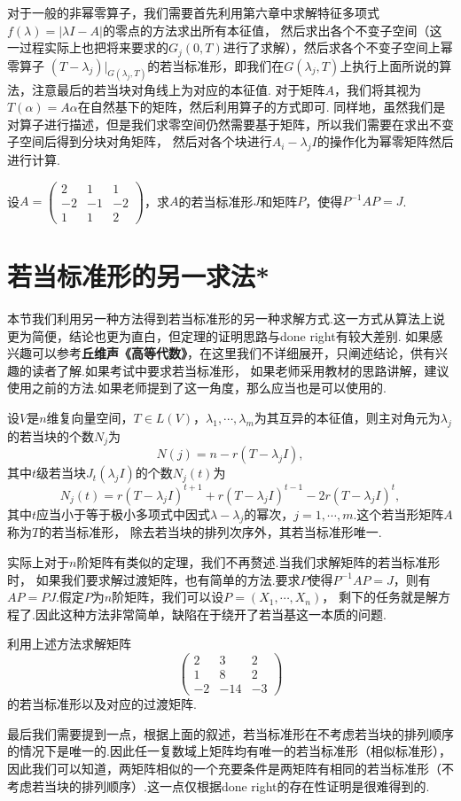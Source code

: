 对于一般的非幂零算子，我们需要首先利用第六章中求解特征多项式$f(\lambda)=|\lambda I-A|$的零点的方法求出所有本征值，
然后求出各个不变子空间（这一过程实际上也把将来要求的$G_j(0,T)$进行了求解），然后求各个不变子空间上幂零算子
$(T-\lambda_j)|_{G(\lambda_j,T)}$的若当标准形，即我们在$G(\lambda_j,T)$上执行上面所说的算法，注意最后的若当块对角线上为对应的本征值.
对于矩阵$A$，我们将其视为$T(\alpha)=A\alpha$在自然基下的矩阵，然后利用算子的方式即可.
同样地，虽然我们是对算子进行描述，但是我们求零空间仍然需要基于矩阵，所以我们需要在求出不变子空间后得到分块对角矩阵，
然后对各个块进行$A_i-\lambda_jI$的操作化为幂零矩阵然后进行计算.
\begin{example}
	设$A=\begin{pmatrix}
		2 & 1 & 1 \\ -2 & -1 & -2 \\ 1 & 1 & 2
	\end{pmatrix}$，求$A$的若当标准形$J$和矩阵$P$，使得$P^{-1}AP=J$.
\end{example}

\section{若当标准形的另一求法*}\label{若当标准形的另一求法}
本节我们利用另一种方法得到若当标准形的另一种求解方式.这一方式从算法上说更为简便，结论也更为直白，但定理的证明思路与done right有较大差别.
如果感兴趣可以参考\textbf{丘维声《高等代数》}，在这里我们不详细展开，只阐述结论，供有兴趣的读者了解.如果考试中要求若当标准形，
如果老师采用教材的思路讲解，建议使用之前的方法.如果老师提到了这一角度，那么应当也是可以使用的.
\begin{theorem}
	设$V$是$n$维复向量空间，$T\in L(V)$，$\lambda_1,\cdots,\lambda_m$为其互异的本征值，则主对角元为$\lambda_j$的若当块的个数$N_j$为
	$$N(j)=n-r(T-\lambda_jI),$$
	其中$t$级若当块$J_t(\lambda_jI)$的个数$N_j(t)$为
	$$N_j(t)=r(T-\lambda_jI)^{t+1}+r(T-\lambda_jI)^{t-1}-2r(T-\lambda_jI)^t,$$
	其中$t$应当小于等于极小多项式中因式$\lambda-\lambda_j$的幂次，$j=1,\cdots,m$.这个若当形矩阵$A$称为$T$的若当标准形，
	除去若当块的排列次序外，其若当标准形唯一.
\end{theorem}
实际上对于$n$阶矩阵有类似的定理，我们不再赘述.当我们求解矩阵的若当标准形时，
如果我们要求解过渡矩阵，也有简单的方法.要求$P$使得$P^{-1}AP=J$，则有$AP=PJ$.假定$P$为$n$阶矩阵，我们可以设$P=(X_1,\cdots,X_n)$，
剩下的任务就是解方程了.因此这种方法非常简单，缺陷在于绕开了若当基这一本质的问题.
\begin{example}
	利用上述方法求解矩阵$$\begin{pmatrix}
		2 & 3 & 2 \\ 1 & 8 & 2 \\ -2 & -14 & -3
	\end{pmatrix}$$的若当标准形以及对应的过渡矩阵.
\end{example}
最后我们需要提到一点，根据上面的叙述，若当标准形在不考虑若当块的排列顺序的情况下是唯一的.因此任一复数域上矩阵均有唯一的若当标准形（相似标准形），
因此我们可以知道，两矩阵相似的一个充要条件是两矩阵有相同的若当标准形（不考虑若当块的排列顺序）.这一点仅根据done right的存在性证明是很难得到的.

